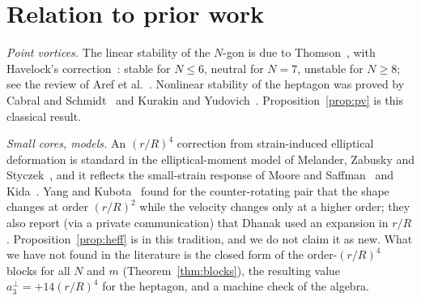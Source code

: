 \documentclass[11pt]{article}
\theoremstyle{definition}
\theoremstyle{remark}
\begin{document}
\section{Relation to prior work}\label{sec:prior}

\emph{Point vortices.} The linear stability of the $N$-gon is due to Thomson~\cite{Thomson1883}, with Havelock's
correction~\cite{Havelock1931}: stable for $N\le6$, neutral for $N=7$, unstable for $N\ge8$; see the review of Aref et
al.~\cite{Aref2003}. Nonlinear stability of the heptagon was proved by Cabral and Schmidt~\cite{CabralSchmidt1999} and
Kurakin and Yudovich~\cite{KurakinYudovich2002}. Proposition~\ref{prop:pv} is this classical result.

\emph{Small cores, models.} An $(r/R)^4$ correction from strain-induced elliptical deformation is standard in the
elliptical-moment model of Melander, Zabusky and Styczek~\cite{MZS1986}, and it reflects the small-strain response of
Moore and Saffman~\cite{MooreSaffman1971} and Kida~\cite{Kida1981}. Yang and Kubota~\cite{YangKubota1994} found for the
counter-rotating pair that the shape changes at order $(r/R)^2$ while the velocity changes only at a higher order; they also
report (via a private communication) that Dhanak used an expansion in $r/R$. Proposition~\ref{prop:heff} is in this tradition,
and we do not claim it as new. What we have not found in the literature is the closed form of the order-$(r/R)^4$ blocks for
all $N$ and $m$ (Theorem~\ref{thm:blocks}), the resulting value $a^\perp_3=+14(r/R)^4$ for the heptagon, and a machine check
of the algebra.
\end{document}
